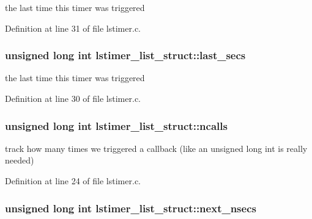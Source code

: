 the last time this timer was triggered 



Definition at line 31 of file lstimer.\-c.

\hypertarget{structlstimer__list__struct_ab0ac2907735701cb24ec9af95a1cc787}{
\subsubsection[{last\-\_\-secs}]{\setlength{\rightskip}{0pt plus 5cm}unsigned long int lstimer\-\_\-list\-\_\-struct\-::last\-\_\-secs}}\label{structlstimer__list__struct_ab0ac2907735701cb24ec9af95a1cc787}


the last time this timer was triggered 



Definition at line 30 of file lstimer.\-c.

\hypertarget{structlstimer__list__struct_aa56c5b8ce7fa0ae93132cb9908195836}{
\subsubsection[{ncalls}]{\setlength{\rightskip}{0pt plus 5cm}unsigned long int lstimer\-\_\-list\-\_\-struct\-::ncalls}}\label{structlstimer__list__struct_aa56c5b8ce7fa0ae93132cb9908195836}


track how many times we triggered a callback (like an unsigned long int is really needed) 



Definition at line 24 of file lstimer.\-c.

\hypertarget{structlstimer__list__struct_ab115115d5be7933f98a094b46b6583bb}{
\subsubsection[{next\-\_\-nsecs}]{\setlength{\rightskip}{0pt plus 5cm}unsigned long int lstimer\-\_\-list\-\_\-struct\-::next\-\_\-nsecs}}\label{structlstimer__list__struct_ab115115d5be7933f98a094b46b6583bb}


